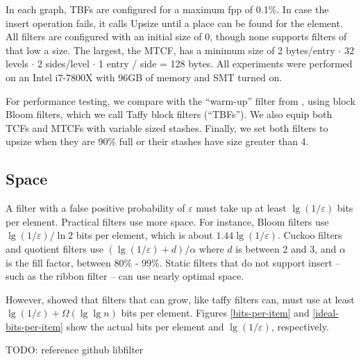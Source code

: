 \documentclass[manuscript,screen,review]{acmart}
\begin{document}
In each graph, TBFs are configured for a maximum fpp of 0.1\%.
In case the insert operation fails, it calls Upsize until a place can be found for the element.
All filters are configured with an initial size of 0, though none supports filters of that low a size.
The largest, the MTCF, has a minimum size of 2 bytes/entry $\cdot$ 32 levels $\cdot$ 2 sides/level $\cdot$ 1 entry / side = 128 bytes.
All experiments were performed on an Intel i7-7800X with 96GB of memory and SMT turned on.

For performance testing, we compare with the ``warm-up'' filter from \cite{psw}, using block Bloom filters, which we call Taffy block filters (``TBFs''). \cite{block-bloom}
We also equip both TCFs and MTCFs with variable sized stashes. \cite{stash}
Finally, we set both filters to upsize when they are 90\% full or their stashes have size greater than 4.

\subsection{Space}

A filter with a false positive probability of $\varepsilon$ must take up at least $\lg (1/\varepsilon)$ bits per element.
Practical filters use more space.
For instance, Bloom filters use $\lg (1/\varepsilon)/\ln 2$ bits per element, which is about $1.44 \lg (1/\varepsilon)$.
Cuckoo filters and quotient filters use $(\lg (1/\varepsilon) + d) / \alpha$ where $d$ is between 2 and 3, and $\alpha$ is the fill factor, between 80\% - 99\%. \cite{cuckoo,quotient-filter,vector-quotient}
Static filters that do not support insert -- such as the ribbon filter -- can use nearly optimal space. \cite{ribbon}

However, \cite{psw} showed that filters that can grow, like taffy filters can, must use at least $\lg (1/\varepsilon) + \Omega(\lg \lg n)$ bits per element.
Figures \ref{bits-per-item} and \ref{ideal-bits-per-item} show the actual bits per element and $\lg (1/\varepsilon)$, respectively.




TODO: reference github libfilter

\end{document}
